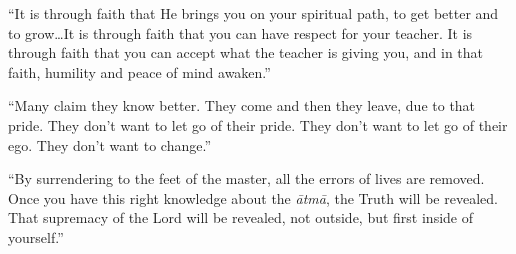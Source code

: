 \enquote{It is through faith that He brings you on your spiritual path, to get better and to grow\ldots It is through faith that you can have respect for your teacher. It is through faith that you can accept what the teacher is giving you, and in that faith, humility and peace of mind awaken.}

\enquote{Many claim they know better. They come and then they leave, due to that pride. They don’t want to let go of their pride. They don’t want to let go of their ego. They don’t want to change.}

\enquote{By surrendering to the feet of the master, all the errors of lives are removed. Once you have this right knowledge about the \textit{ātmā}, the Truth will be revealed. That supremacy of the Lord will be revealed, not outside, but first inside of yourself.}
